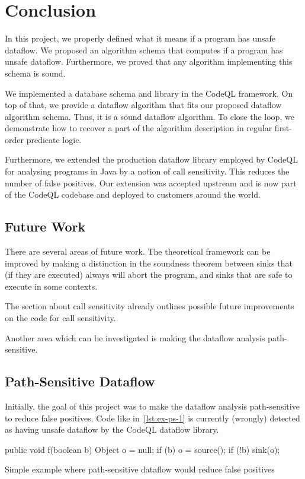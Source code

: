 \section{Conclusion}
In this project, we properly defined what it means if a program has unsafe dataflow.
We proposed an algorithm schema that computes if a program has unsafe dataflow.
Furthermore, we proved that any algorithm implementing this schema is sound.

We implemented a database schema and library in the CodeQL framework.
On top of that, we provide a dataflow algorithm that fits our proposed dataflow algorithm schema.
Thus, it is a sound dataflow algorithm.
To close the loop, we demonstrate how to recover a part of the algorithm description
in regular first-order predicate logic.

Furthermore, we extended the production dataflow library employed by CodeQL for analysing
programs in Java by a notion of call sensitivity.
This reduces the number of false positives.
Our extension was accepted upstream and is now part of the CodeQL codebase and deployed
to customers around the world.

\subsection{Future Work}
There are several areas of future work.
The theoretical framework can be improved by making a distinction in the soundness theorem 
between sinks that (if they are executed) always will abort the program,
and sinks that are safe to execute in some contexts.

The section about call sensitivity already outlines possible future improvements 
on the code for call sensitivity.

Another area which can be investigated is making the dataflow analysis path-sensitive.

\subsection{Path-Sensitive Dataflow}
Initially, the goal of this project was to make the dataflow analysis path-sensitive
to reduce false positives.
Code like in~\autoref{lst:ex-ps-1} is currently (wrongly) detected as having unsafe dataflow
by the CodeQL dataflow library.

\begin{listing}[h]
    \begin{javacode}
public void f(boolean b) {
    Object o = null;
    if (b) {
        o = source();
    }
    if (!b) {
        sink(o);
    }
}
    \end{javacode}
    \caption{Simple example where path-sensitive dataflow would reduce false positives}
    \label{lst:ex-ps-1}
\end{listing}

